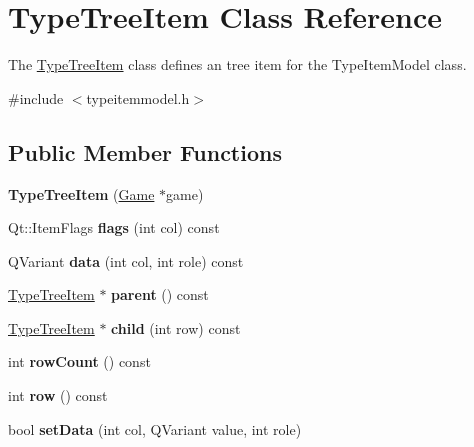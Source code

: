 \hypertarget{class_type_tree_item}{\section{\-Type\-Tree\-Item \-Class \-Reference}
\label{class_type_tree_item}
}


\-The \hyperlink{class_type_tree_item}{\-Type\-Tree\-Item} class defines an tree item for the \-Type\-Item\-Model class.  




{\ttfamily \#include $<$typeitemmodel.\-h$>$}

\subsection*{\-Public \-Member \-Functions}
\begin{DoxyCompactItemize}
\item 
\hypertarget{class_type_tree_item_a0955484034ad18bc778655fbcf78b435}{{\bfseries \-Type\-Tree\-Item} (\hyperlink{class_game}{\-Game} $\ast$game)}\label{class_type_tree_item_a0955484034ad18bc778655fbcf78b435}

\item 
\hypertarget{class_type_tree_item_a160ac83e2f8d1161735363bbb72ab0bb}{\-Qt\-::\-Item\-Flags {\bfseries flags} (int col) const }\label{class_type_tree_item_a160ac83e2f8d1161735363bbb72ab0bb}

\item 
\hypertarget{class_type_tree_item_a8665b9f195b39093ca6116ff65b09412}{\-Q\-Variant {\bfseries data} (int col, int role) const }\label{class_type_tree_item_a8665b9f195b39093ca6116ff65b09412}

\item 
\hypertarget{class_type_tree_item_a86e9e8d9fca786ac45e81e78d01b9397}{\hyperlink{class_type_tree_item}{\-Type\-Tree\-Item} $\ast$ {\bfseries parent} () const }\label{class_type_tree_item_a86e9e8d9fca786ac45e81e78d01b9397}

\item 
\hypertarget{class_type_tree_item_a06d4681904a79553a81b09d4b31f0731}{\hyperlink{class_type_tree_item}{\-Type\-Tree\-Item} $\ast$ {\bfseries child} (int row) const }\label{class_type_tree_item_a06d4681904a79553a81b09d4b31f0731}

\item 
\hypertarget{class_type_tree_item_a5308dd7d3672750f2d862683d2387dcc}{int {\bfseries row\-Count} () const }\label{class_type_tree_item_a5308dd7d3672750f2d862683d2387dcc}

\item 
\hypertarget{class_type_tree_item_aed3d1b02b89bc0a22842bc54833eaecd}{int {\bfseries row} () const }\label{class_type_tree_item_aed3d1b02b89bc0a22842bc54833eaecd}

\item 
\hypertarget{class_type_tree_item_a465d8935d2564e05d16a2765b8b69434}{bool {\bfseries set\-Data} (int col, \-Q\-Variant value, int role)}\label{class_type_tree_item_a465d8935d2564e05d16a2765b8b69434}

\end{DoxyCompactItemize}


